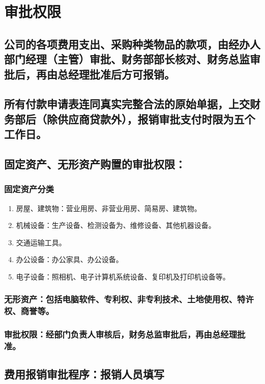 \documentclass{ctexart}
\begin{document}
\section{审批权限}
\label{sec-2}
\subsection{公司的各项费用支出、采购种类物品的款项，由经办人部门经理（主管）审批、财务部部长核对、财务总监审批后，再由总经理批准后方可报销。}
\label{sec-2-1}
\subsection{所有付款申请表连同真实完整合法的原始单据，上交财务部后（除供应商贷款外），报销审批支付时限为五个工作日。}
\label{sec-2-2}
\subsection{固定资产、无形资产购置的审批权限：}
\label{sec-2-3}
\subsubsection{固定资产分类}
\label{sec-2-3-1}
\begin{enumerate}
\item 房屋、建筑物：营业用房、非营业用房、简易房、建筑物。
\label{sec-2-3-1-1}
\item 机械设备：生产设备、检测设备为、维修设备、其他机器设备。
\label{sec-2-3-1-2}
\item 交通运输工具。
\label{sec-2-3-1-3}
\item 办公设备：办公家具、办公设备。
\label{sec-2-3-1-4}
\item 电子设备：照相机、电子计算机系统设备、复印机及打印机设备等。
\label{sec-2-3-1-5}
\end{enumerate}
\subsubsection{无形资产：包括电脑软件、专利权、非专利技术、土地使用权、特许权、商誉等。}
\label{sec-2-3-2}
\subsubsection{审批权限：经部门负责人审核后，财务总监审批后，再由总经理批准。}
\label{sec-2-3-3}
\subsection{费用报销审批程序：报销人员填写}
\label{sec-2-4}
\end{document}
